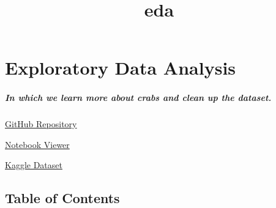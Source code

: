 \documentclass[11pt]{article}
\title{eda}
\begin{document}
    
    \maketitle
    
    

    
    \section{Exploratory Data Analysis}\label{exploratory-data-analysis}

\subparagraph{\texorpdfstring{\emph{In which we learn more about crabs
and clean up the
dataset.}}{In which we learn more about crabs and clean up the dataset.}}\label{in-which-we-learn-more-about-crabs-and-clean-up-the-dataset.}

\href{https://github.com/ahester57/ai_workshop/tree/master/notebooks/time_for_crab/0-eda}{GitHub
Repository}

\href{https://nbviewer.jupyter.org/github/ahester57/ai_workshop/blob/master/notebooks/time_for_crab/0-eda/eda.ipynb}{Notebook
Viewer}

\href{https://www.kaggle.com/sidhus/crab-age-prediction}{Kaggle Dataset}

    \subsection{Table of Contents}\label{table-of-contents}
\end{document}
